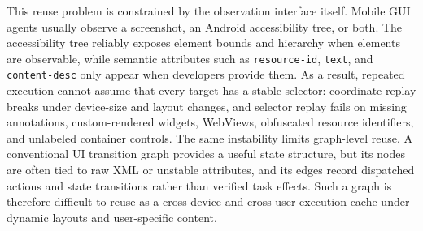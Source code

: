 This reuse problem is constrained by the observation interface itself.
Mobile GUI agents usually observe a screenshot, an Android accessibility tree, or both.
The accessibility tree reliably exposes element bounds and hierarchy when elements are observable, while semantic attributes such as \texttt{resource-id}, \texttt{text}, and \texttt{content-desc} only appear when developers provide them.
As a result, repeated execution cannot assume that every target has a stable selector: coordinate replay breaks under device-size and layout changes, and selector replay fails on missing annotations, custom-rendered widgets, WebViews, obfuscated resource identifiers, and unlabeled container controls.
The same instability limits graph-level reuse.
A conventional UI transition graph provides a useful state structure, but its nodes are often tied to raw XML or unstable attributes, and its edges record dispatched actions and state transitions rather than verified task effects.
Such a graph is therefore difficult to reuse as a cross-device and cross-user execution cache under dynamic layouts and user-specific content.

